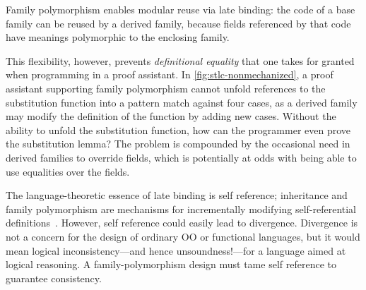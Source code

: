 Family polymorphism enables modular reuse via late binding:
the code of a base family can be reused by a derived family,
because fields referenced by that code have meanings polymorphic to the
enclosing family.

This flexibility, however, prevents \emph{definitional equality}
that one takes for granted when programming in a proof assistant.
In \cref{fig:stlc-nonmechanized}, a proof assistant supporting family
polymorphism cannot unfold references to the substitution function into a
pattern match against four cases,
as a derived family may modify the definition of the function by adding
new cases.
Without the ability to unfold the substitution function, how can the
programmer even prove the substitution lemma?
%
The problem is compounded by the occasional need in derived families to override fields,
which is potentially at odds with being able to use equalities over the fields.



The language-theoretic essence of late binding is self reference;
inheritance and family polymorphism are mechanisms for
incrementally modifying self-referential definitions~\cite{cook1990inheritance}.
However, self reference could easily lead to divergence.
Divergence is not a concern for the design of ordinary OO or
functional languages, but it would mean logical inconsistency---and
hence unsoundness!---for a language aimed at logical reasoning.
A family-polymorphism design must tame self reference to guarantee consistency.


